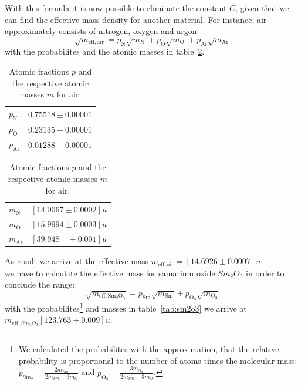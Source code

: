 With this formula it is now possible to eliminate the constant $C$, given that we can find the effective mass density for another
material. For instance, air approximately consists of nitrogen, oxygen and argon: 
\begin{equation}
\sqrt{m_{\mathrm{eff,air}}} =p_{\mathrm{N}}\sqrt{m_{\mathrm{N}}} +p_{\mathrm{O}} \sqrt{m_{\mathrm{O}}} +p_{\mathrm{Ar}} \sqrt{m_{\mathrm{Ar}}}
\end{equation}
with the probabilites \cite{ver} and the atomic masses \cite{haynes} in table~\ref{tab:air}.
\begin{table}
\caption{Atomic fractions $p$ and the respective atomic masses $m$ for air.}
\centering
\begin{tabular}{ll}
    \cellcolor{tabcolor} $p_{\mathrm{N}}$    &$0.75518 \pm 0.00001$ \\
    \cellcolor{tabcolor} $p_{\mathrm{O}} $   &$0.23135 \pm 0.00001$\\
    \cellcolor{tabcolor} $p_{\mathrm{Ar}}$   &$0.01288 \pm 0.00001$
\end{tabular}
\begin{tabular}{ll} 
    \cellcolor{tabcolor} $m_{\mathrm{N}}  $ & $[14.0067 \pm 0.0002] u $ \\
    \cellcolor{tabcolor} $m_{\mathrm{O}}  $ & $ [15.9994 \pm 0.0003] u$  \\
    \cellcolor{tabcolor} $m_{\mathrm{Ar}} $ & $ [39.948 \quad \pm 0.001] u $
\end{tabular}
\label{tab:air}
\end{table}
As result we arrive at the effective mass  $m_{\mathrm{eff,air}} = [14.6926\pm0.0007]u$. \\
we have to calculate the effective mass for samarium oxide $Sm_2O_3$ in order to conclude the range:
\begin{equation}
\sqrt{m_{\mathrm{eff,Sm_2O_3}}} =p_{\mathrm{Sm}}\sqrt{m_{\mathrm{Sm}}} +p_{\mathrm{O_3}} \sqrt{m_{\mathrm{O_3}}} 
\end{equation}
with the probabilites\footnote{%
We calculated the probabilites with the approximation\cite{staatsexamen}, 
that the relative probability is proportional
to the number of atoms times the molecular mass: $p_{\mathrm{Sm_2}} = \frac{2 m_{Sm}}{2m_{Sm} + 3m_{O}}$ and
$p_{\mathrm{O_3}} = \frac{3 m_{O_3}}{2m_{Sm} + 3m_{O}}$.
}
and masses \cite{haynes} in table~\ref{tab:sm2o3} we
arrive at $m_{\mathrm{eff},Sm_2O_3}[123.763\pm0.009]u$.
